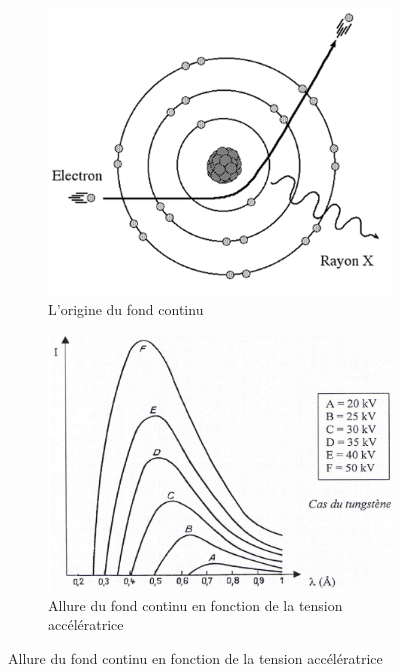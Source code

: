 \documentclass{article}
\begin{document}
\begin{figure}[ht]
    \centering
    \begin{subfigure}{0.48\textwidth}
        \centering
        \includegraphics[width=0.9\linewidth]{Fig/origine-fond-continu.png}
        \caption{L'origine du fond continu}
        \label{fig:origine fond continu}
    \end{subfigure}
    \hfill\begin{subfigure}{0.48\textwidth}
        \centering
        \includegraphics[width=0.9\linewidth]{Fig/Spectre-RX-fond-continu.png}
        \caption{Allure du fond continu en fonction de la tension accélératrice}
        \label{fig:Spetre RX fond continu}
    \end{subfigure}
\end{figure}
\end{document}
